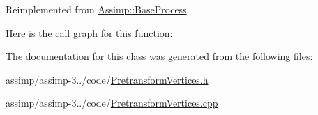 Reimplemented from \hyperlink{class_assimp_1_1_base_process_aae14d0a8c5918642d4a272b7b74b5d70}{Assimp\+::\+Base\+Process}.



Here is the call graph for this function\+:




The documentation for this class was generated from the following files\+:\begin{DoxyCompactItemize}
\item 
assimp/assimp-\/3../code/\hyperlink{_pretransform_vertices_8h}{Pretransform\+Vertices.\+h}\item 
assimp/assimp-\/3../code/\hyperlink{_pretransform_vertices_8cpp}{Pretransform\+Vertices.\+cpp}\end{DoxyCompactItemize}
